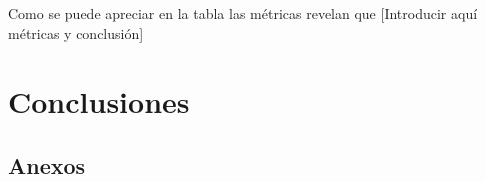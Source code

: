 \documentclass[12pt,letterpaper]{article}
\begin{document}
Como se puede apreciar en la tabla las métricas revelan que
[Introducir aquí métricas y conclusión]




\section{Conclusiones}




\subsection{Anexos}
\end{document}
